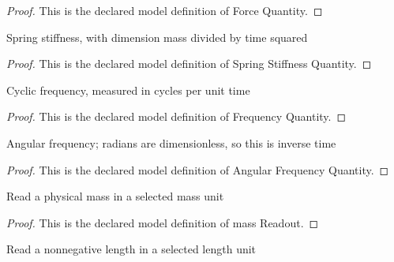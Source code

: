 \begin{proof}
  This is the declared model definition of Force Quantity.
\end{proof}
\begin{definition}
  \label{def:physics:phyx-mini-0203:phyxminiproblems-problemphyxmini0203-springstiffnessquantity}
  Spring stiffness, with dimension mass divided by time squared
\end{definition}
\begin{proof}
  This is the declared model definition of Spring Stiffness Quantity.
\end{proof}
\begin{definition}
  \label{def:physics:phyx-mini-0203:phyxminiproblems-problemphyxmini0203-frequencyquantity}
  Cyclic frequency, measured in cycles per unit time
\end{definition}
\begin{proof}
  This is the declared model definition of Frequency Quantity.
\end{proof}
\begin{definition}
  \label{def:physics:phyx-mini-0203:phyxminiproblems-problemphyxmini0203-angularfrequencyquantity}
  Angular frequency; radians are dimensionless, so this is inverse time
\end{definition}
\begin{proof}
  This is the declared model definition of Angular Frequency Quantity.
\end{proof}
\begin{definition}
  \label{def:physics:phyx-mini-0203:phyxminiproblems-problemphyxmini0203-massreadout}
  Read a physical mass in a selected mass unit
\end{definition}
\begin{proof}
  This is the declared model definition of mass Readout.
\end{proof}
\begin{definition}
  \label{def:physics:phyx-mini-0203:phyxminiproblems-problemphyxmini0203-lengthreadout}
  Read a nonnegative length in a selected length unit
\end{definition}
